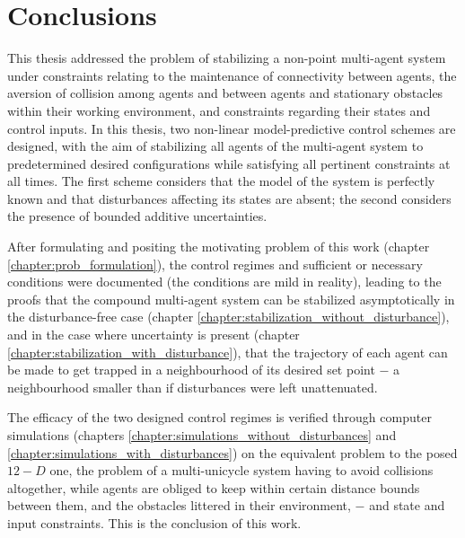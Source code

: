 \chapter{Conclusions}

This thesis addressed the problem of stabilizing a non-point multi-agent system
under constraints relating to the maintenance of connectivity between
agents, the aversion of collision among agents and between agents and
stationary obstacles within their working environment, and constraints
regarding their states and control inputs. In this thesis, two non-linear
model-predictive control schemes are designed, with the aim of stabilizing
all agents of the multi-agent system to predetermined desired configurations
while satisfying all pertinent constraints at all times. The first scheme
considers that the model of the system is perfectly known and that disturbances
affecting its states are absent; the second considers the presence of
bounded additive uncertainties.

After formulating and positing the motivating problem of this work
(chapter \ref{chapter:prob_formulation}), the control regimes and sufficient or
necessary conditions were documented (the conditions are mild in reality),
leading to the proofs that the compound multi-agent system can be stabilized
asymptotically in the disturbance-free case
(chapter \ref{chapter:stabilization_without_disturbance}), and in the case where
uncertainty is present (chapter \ref{chapter:stabilization_with_disturbance}),
that the trajectory of each agent can be made to get trapped in a neighbourhood
of its desired set point $-$ a neighbourhood smaller than if disturbances
were left unattenuated.

The efficacy of the two designed control regimes is verified through computer
simulations (chapters \ref{chapter:simulations_without_disturbances} and
\ref{chapter:simulations_with_disturbances}) on the equivalent problem to the
posed $12-D$ one, the problem of a multi-unicycle system having to avoid
collisions altogether, while agents are obliged to keep within certain distance
bounds between them, and the obstacles littered in their environment, $-$ and
state and input constraints. This is the conclusion of this work.
